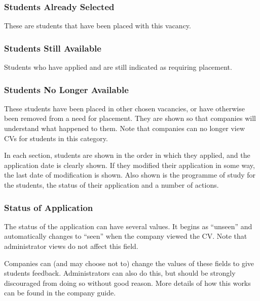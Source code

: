 \documentclass[12 pt]{book}
\begin{document}
\subsubsection{Students Already Selected}

These are students that have been placed with this vacancy.

\subsubsection{Students Still Available}

Students who have applied and are still indicated as requiring placement.

\subsubsection{Students No Longer Available}

These students have been placed in other chosen vacancies, or have otherwise
been removed from a need for placement. They are shown so that companies will
understand what happened to them. Note that companies can no longer view CVs
for students in this category.

In each section, students are shown in the order in which they applied, and
the application date is clearly shown. If they modified their application in
some way, the last date of modification is shown. Also shown is the programme
of study for the students, the status of their application and a number of
actions.


\subsubsection{Status of Application}

The status of the application can have several values. It begins as ``unseen''
and automatically changes to ``seen'' when the company viewed the CV. Note that
administrator views do not affect this field.

Companies can (and may choose not to) change the values of these fields to
give students feedback. Administrators can also do this, but should be
strongly discouraged from doing so without good reason. More details of how
this works can be found in the company guide.
\end{document}
